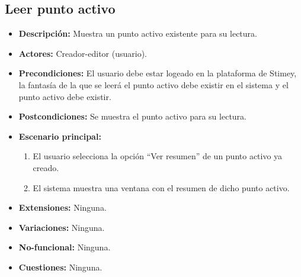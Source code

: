 \documentclass[12pt,letterpaper]{article}
\begin{document}
\subsection{Leer punto activo}
\begin{itemize}
	\item \textbf{Descripción:} Muestra un punto activo existente para su lectura.
	\item \textbf{Actores:} Creador-editor (usuario).
	\item \textbf{Precondiciones:} El usuario debe estar logeado en la plataforma de Stimey, la fantasía de la que se leerá el punto activo debe existir en el sistema y el punto activo debe existir.
	\item \textbf{Postcondiciones:} Se muestra el punto activo para su lectura.
	\item \textbf{Escenario principal:}
	\begin{enumerate}
		\item El usuario selecciona la opción ``Ver resumen'' de un punto activo ya creado.
		\item El sistema muestra una ventana con el resumen de dicho punto activo.
	\end{enumerate}
	\item \textbf{Extensiones:} Ninguna.
	\item \textbf{Variaciones:} Ninguna.
	\item \textbf{No-funcional:} Ninguna.
	\item \textbf{Cuestiones:} Ninguna.
\end{itemize}
\end{document}
